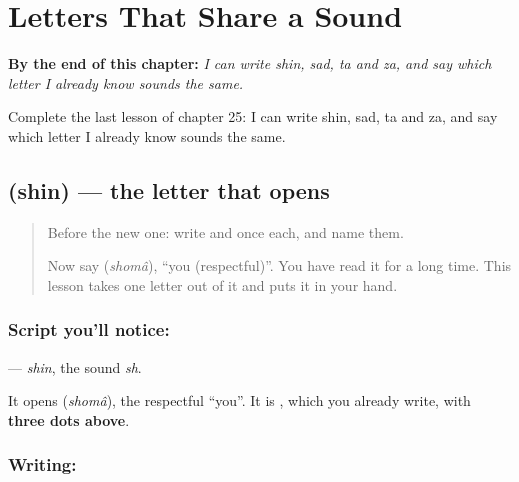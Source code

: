 
\chapter{Letters That Share a Sound}
\label{ch:fa-letters-share-a-sound}

\begin{chapteropening}
\textbf{By the end of this chapter:} \emph{I can write shin, sad, ta and za, and say which letter I already know sounds the same.}

Complete the last lesson of chapter 25: I can write shin, sad, ta and za, and say which letter I already know sounds the same.
\end{chapteropening}

\section[\texorpdfstring{\fa{ش} (shin)}{ش (shin)}]{ (shin) — the letter that opens }

\label{lesson:FA-W25-shin}



\begin{quote}
Before the new one: write  and  once each, and name them.

Now say \textbf{} (\emph{shomâ}), \textquotedblleft{}you (respectful)\textquotedblright{}. You have read it for a long time. This lesson takes one letter out of it and puts it in your hand.
\end{quote}

\subsection*{Script you'll notice: }
\textbf{} — \emph{shin}, the sound \emph{sh}.

It opens \textbf{} (\emph{shomâ}), the respectful \textquotedblleft{}you\textquotedblright{}. It is \textbf{}, which you already write, with \textbf{three dots above}.

\subsection*{Writing: }


